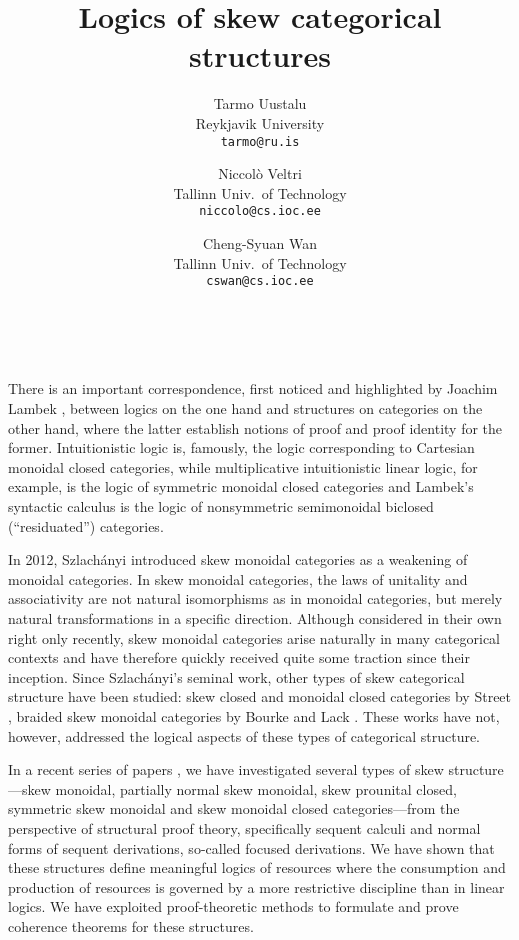 \documentclass{article}
\begin{document}
\title{Logics of skew categorical structures}

\author{Tarmo Uustalu \\ Reykjavik University \\ \texttt{tarmo@ru.is}
\and 
Niccol\`o Veltri \\ Tallinn Univ.\ of Technology \\ \texttt{niccolo@cs.ioc.ee}
\and  
Cheng-Syuan Wan \\ Tallinn Univ.\ of Technology \\ \texttt{cswan@cs.ioc.ee}
}

\date{~}

\maketitle

\thispagestyle{empty}

There is an important correspondence, first noticed and highlighted by
Joachim Lambek \cite{Lam}, between logics on the one hand and structures on
categories on the other hand, where the latter establish notions of
proof and proof identity for the former. Intuitionistic logic is,
famously, the logic corresponding to Cartesian monoidal closed
categories, while multiplicative intuitionistic linear logic, for
example, is the logic of symmetric monoidal closed categories and
Lambek's syntactic calculus is the logic of nonsymmetric semimonoidal
biclosed (``residuated'') categories.

In 2012, Szlach\'anyi \cite{Szl} introduced skew monoidal categories
as a weakening of monoidal categories. In skew monoidal categories,
the laws of unitality and associativity are not natural isomorphisms
as in monoidal categories, but merely natural transformations in a
specific direction. Although considered in their own right only
recently, skew monoidal categories arise naturally in many categorical
contexts and have therefore quickly received quite some traction since
their inception. Since Szlach\'anyi's seminal work, other types of
skew categorical structure have been studied: skew closed and monoidal
closed categories by Street \cite{Str}, braided skew monoidal
categories by Bourke and Lack \cite{BL}. These works have not,
however, addressed the logical aspects of these types of categorical
structure.

In a recent series of papers
\cite{UVZ:lambek,UVZ:skpcl,UVZ:pn,Vel:ss,UVW}, we have investigated
several types of skew structure---skew monoidal, partially normal skew
monoidal, skew prounital closed, symmetric skew monoidal and skew
monoidal closed categories---from the perspective of structural proof
theory, specifically sequent calculi and normal forms of sequent
derivations, so-called focused derivations. We have shown that these
structures define meaningful logics of resources where the consumption
and production of resources is governed by a more restrictive
discipline than in linear logics. We have exploited proof-theoretic
methods to formulate and prove coherence theorems for these
structures.
\end{document}
